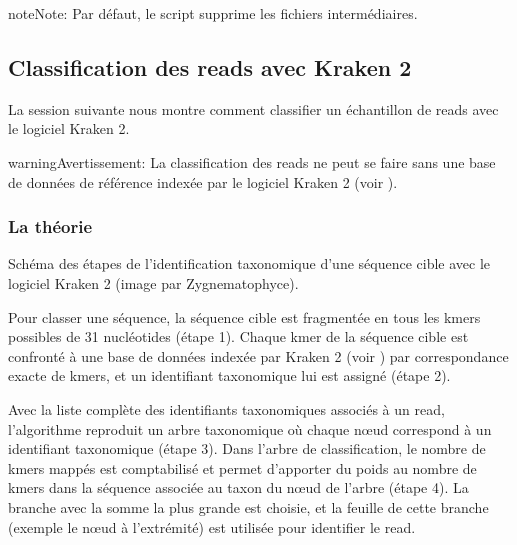 \documentclass[letterpaper,10pt,french]{sphinxmanual}
\let\sphinxpxdimen\pdfpxdimen\else\newdimen\sphinxpxdimen
\begin{document}
\begin{sphinxadmonition}{note}{Note:}
Par défaut, le script supprime les fichiers intermédiaires.
\end{sphinxadmonition}


\subsection{Classification des reads avec Kraken 2}
\label{\detokenize{tutorial:classification-des-reads-avec-kraken-2}}\label{\detokenize{tutorial:classification-kraken2}}
La session suivante nous montre comment classifier un échantillon de reads avec le logiciel Kraken 2.

\begin{sphinxadmonition}{warning}{Avertissement:}
La classification des reads ne peut se faire sans une base de données de référence indexée par le logiciel Kraken 2 (voir {\hyperref[\detokenize{tutorial:indexation-kraken2}]{}}).
\end{sphinxadmonition}


\subsubsection{La théorie}
\label{\detokenize{tutorial:id24}}
\noindent{\hspace*{\fill}\sphinxincludegraphics[width=450\sphinxpxdimen]{{classification_kraken2}.png}}

Schéma des étapes de l’identification taxonomique d’une séquence cible avec le logiciel Kraken 2 (image par Zygnematophyce).

Pour classer une séquence, la séquence cible est fragmentée en tous les k\sphinxhyphen{}mers possibles de 31 nucléotides (étape 1). Chaque k\sphinxhyphen{}mer de la séquence cible est confronté à une base de données indexée par Kraken 2 (voir {\hyperref[\detokenize{tutorial:indexation-kraken2}]{}}) par correspondance exacte de k\sphinxhyphen{}mers, et un identifiant taxonomique lui est assigné (étape 2).

Avec la liste complète des identifiants taxonomiques associés à un read, l’algorithme reproduit un arbre taxonomique où chaque nœud correspond à un identifiant taxonomique (étape 3). Dans l’arbre de classification, le nombre de k\sphinxhyphen{}mers mappés est comptabilisé et permet d’apporter du poids au nombre de k\sphinxhyphen{}mers dans la séquence associée au taxon du nœud de l’arbre (étape 4). La branche avec la somme la plus grande est choisie, et la feuille de cette branche (exemple le nœud à l’extrémité) est utilisée pour identifier le read.
\end{document}
